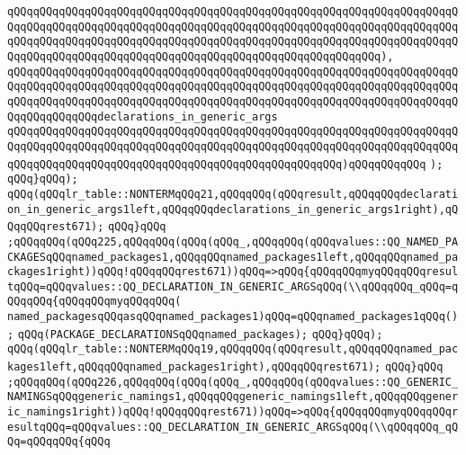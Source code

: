 \verb|qQQqqQQqqQQqqQQqqQQqqQQqqQQqqQQqqQQqqQQqqQQqqQQqqQQqqQQqqQQqqQQqqQQqqQQqqQQqqQQqqQQqqQQqqQQqqQQqqQQqqQQqqQQqqQQqqQQqqQQqqQQqqQQqqQQqqQQqqQQqqQQqqQQqqQQqqQQqqQQqqQQqqQQqqQQqqQQqqQQqqQQqqQQqqQQqqQQqqQQqqQQqqQQqqQQqqQQqqQQqqQQqqQQqqQQqqQQqqQQqqQQqqQQqqQQqqQQqqQQqqQQqqQQq),|\newline
\verb|qQQqqQQqqQQqqQQqqQQqqQQqqQQqqQQqqQQqqQQqqQQqqQQqqQQqqQQqqQQqqQQqqQQqqQQqqQQqqQQqqQQqqQQqqQQqqQQqqQQqqQQqqQQqqQQqqQQqqQQqqQQqqQQqqQQqqQQqqQQqqQQqqQQqqQQqqQQqqQQqqQQqqQQqqQQqqQQqqQQqqQQqqQQqqQQqqQQqqQQqqQQqqQQqqQQqqQQqqQQqqQQqdeclarations_in_generic_args|\newline
\verb|qQQqqQQqqQQqqQQqqQQqqQQqqQQqqQQqqQQqqQQqqQQqqQQqqQQqqQQqqQQqqQQqqQQqqQQqqQQqqQQqqQQqqQQqqQQqqQQqqQQqqQQqqQQqqQQqqQQqqQQqqQQqqQQqqQQqqQQqqQQqqQQqqQQqqQQqqQQqqQQqqQQqqQQqqQQqqQQqqQQqqQQqqQQqqQQq)qQQqqQQqqQQq|\newline
\verb|);|\newline
\verb|qQQq}qQQq);|\newline
\verb|qQQq(qQQqlr_table::NONTERMqQQq21,qQQqqQQq(qQQqresult,qQQqqQQqdeclaration_in_generic_args1left,qQQqqQQqdeclarations_in_generic_args1right),qQQqqQQqrest671);|\newline
\verb|qQQq}qQQq|\newline
\verb|;qQQqqQQq(qQQq225,qQQqqQQq(qQQq(qQQq_,qQQqqQQq(qQQqvalues::QQ_NAMED_PACKAGESqQQqnamed_packages1,qQQqqQQqnamed_packages1left,qQQqqQQqnamed_packages1right))qQQq!qQQqqQQqrest671))qQQq=>qQQq{qQQqqQQqmyqQQqqQQqresultqQQq=qQQqvalues::QQ_DECLARATION_IN_GENERIC_ARGSqQQq(\\qQQqqQQq_qQQq=qQQqqQQq{qQQqqQQqmyqQQqqQQq(|\newline
\verb|named_packagesqQQqasqQQqnamed_packages1)qQQq=qQQqnamed_packages1qQQq();|\newline
\verb|qQQq(PACKAGE_DECLARATIONSqQQqnamed_packages);|\newline
\verb|qQQq}qQQq);|\newline
\verb|qQQq(qQQqlr_table::NONTERMqQQq19,qQQqqQQq(qQQqresult,qQQqqQQqnamed_packages1left,qQQqqQQqnamed_packages1right),qQQqqQQqrest671);|\newline
\verb|qQQq}qQQq|\newline
\verb|;qQQqqQQq(qQQq226,qQQqqQQq(qQQq(qQQq_,qQQqqQQq(qQQqvalues::QQ_GENERIC_NAMINGSqQQqgeneric_namings1,qQQqqQQqgeneric_namings1left,qQQqqQQqgeneric_namings1right))qQQq!qQQqqQQqrest671))qQQq=>qQQq{qQQqqQQqmyqQQqqQQqresultqQQq=qQQqvalues::QQ_DECLARATION_IN_GENERIC_ARGSqQQq(\\qQQqqQQq_qQQq=qQQqqQQq{qQQq|\newline

